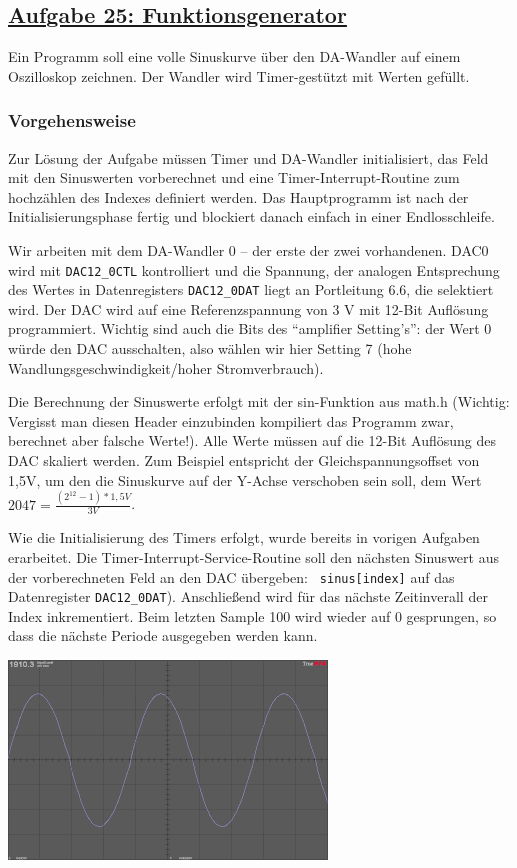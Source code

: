 \subsection
{\href{http://cst.mi.fu-berlin.de/intern/19606-P-MPP/Aufgaben/040901.html}
{Aufgabe 25: Funktionsgenerator}}

Ein Programm soll eine volle Sinuskurve über den DA-Wandler auf einem
Oszilloskop zeichnen. Der Wandler wird Timer-gestützt mit Werten gefüllt.

\subsubsection*{Vorgehensweise}
Zur Lösung der Aufgabe müssen Timer und DA-Wandler initialisiert, das
Feld mit den Sinuswerten vorberechnet und eine Timer-Interrupt-Routine
zum hochzählen des Indexes definiert werden. Das Hauptprogramm ist
nach der Initialisierungsphase fertig und blockiert danach einfach in
einer Endlosschleife.

Wir arbeiten mit dem DA-Wandler 0 -- der erste der zwei vorhandenen. DAC0 wird
mit {\tt DAC12\_\-0CTL} kontrolliert und die Spannung, der analogen
Entsprechung  des Wertes in Datenregisters {\tt DAC12\_\-0DAT} liegt an
Portleitung 6.6, die selektiert wird. Der DAC wird auf eine
Referenzspannung von 3 V mit 12-Bit Auflösung programmiert. Wichtig
sind auch die Bits des ``amplifier Setting's'': der Wert 0 würde den
DAC ausschalten, also wählen wir hier Setting 7 (hohe
Wandlungsgeschwindigkeit/hoher Stromverbrauch).

Die Berechnung der Sinuswerte erfolgt mit der sin-Funktion aus math.h
(Wichtig: Vergisst man diesen Header einzubinden kompiliert das
Programm zwar, berechnet aber falsche Werte!). Alle Werte müssen auf
die 12-Bit Auflösung des DAC skaliert werden. Zum Beispiel entspricht
der Gleichspannungsoffset von 1,5V, um den die Sinuskurve auf der
Y-Achse verschoben sein soll, dem Wert $2047 = \frac{(2^{12}-1) * 1,5V} {3V}$.

Wie die Initialisierung des Timers erfolgt, wurde bereits in vorigen
Aufgaben erarbeitet. Die Timer-Interrupt-Service-Routine soll den nächsten
Sinuswert aus der vorberechneten Feld an den DAC übergeben: {\tt
  sinus[index]} auf das Datenregister {\tt DAC12\_\-0DAT}). Anschließend wird für das nächste Zeitinverall der
Index inkrementiert. Beim letzten Sample 100 wird wieder auf 0
gesprungen, so dass die nächste Periode ausgegeben werden
kann.

\begin{center}
\includegraphics[scale=0.75]{aufgaben/25.png}
\end {center}

